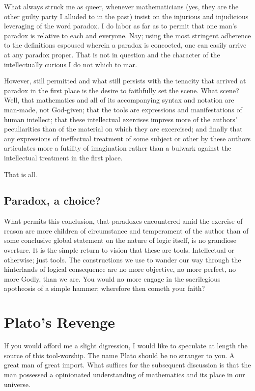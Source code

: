 \documentclass{article}
\begin{document}
	What always struck me as queer, whenever mathematicians (yes, they are the other guilty party I alluded to in the past) insist on the injurious and injudicious leveraging of the word paradox. I do labor as far as to permit that one man's paradox is relative to each and everyone. Nay; using the most stringent adherence to the definitions espoused wherein a paradox is concocted, one can easily arrive at any paradox proper. That is not in question and the character of the intellectually curious I do not which to mar.
	
	However, still permitted and what still persists with the tenacity that arrived at paradox in the first place is the desire to faithfully set the scene. What scene? Well, that mathematics and all of its accompanying syntax and notation are man-made, not God-given; that the tools are expressions and manifestations of human intellect; that these intellectual exercises impress more of the authors' peculiarities than of the material on which they are excercised; and finally that any expressions of ineffectual treatment of some subject or other by these authors articulates more a futility of imagination rather than a bulwark against the intellectual treatment in the first place.
	
	That is all.
	
	\subsection{Paradox, a choice?}
	
	What permits this conclusion, that paradoxes encountered amid the exercise of reason are more children of circumstance and temperament of the author than of some conclusive global statement on the nature of logic itself, is no grandiose overture. It is the simple return to vision that these are tools. Intellectual or otherwise; just tools. The constructions we use to wander our way through the hinterlands of logical consequence are no more objective, no more perfect, no more Godly, than we are. You would no more engage in the sacrilegious apotheosis of a simple hammer; wherefore then cometh your faith?
	
	\section{Plato's Revenge}
	
	If you would afford me a slight digression, I would like to speculate at length the source of this tool-worship. The name Plato should be no stranger to you. A great man of great import. What suffices for the subsequent discussion is that the man possessed a opinionated understanding of mathematics and its place in our universe.
	
\end{document}

